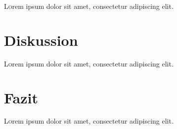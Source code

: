 \documentclass[twoside,twocolumn]{article}
\begin{document}
\lettrine[nindent=0em,lines=3]{L} orem ipsum dolor sit amet, consectetur adipiscing elit.
\blindtext %

\blindtext %


\section{Diskussion}

\lettrine[nindent=0em,lines=3]{L} orem ipsum dolor sit amet, consectetur adipiscing elit.
\blindtext %

\blindtext %


\section{Fazit}

\lettrine[nindent=0em,lines=3]{L} orem ipsum dolor sit amet, consectetur adipiscing elit.
\blindtext %

\blindtext %


\renewcommand{\refname}{Quellenverzeichnis}




\end{document}
